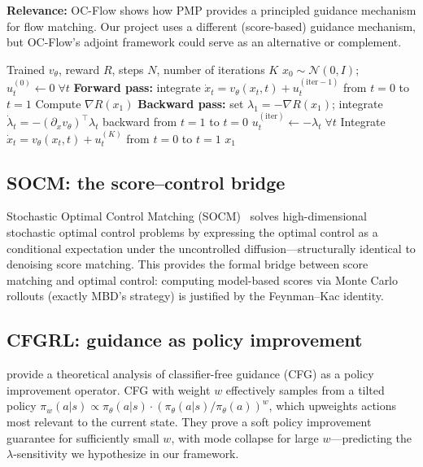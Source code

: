 \documentclass[11pt,letterpaper]{article}
\theoremstyle{plain}
\theoremstyle{definition}
\theoremstyle{remark}
\newcommand{\calN}{\mathcal{N}}
\newcommand{\grad}{\nabla}
\begin{document}
\textbf{Relevance:} OC-Flow shows how PMP provides a principled
guidance mechanism for flow matching.  Our project uses a different
(score-based) guidance mechanism, but OC-Flow's adjoint framework could
serve as an alternative or complement.

\begin{algorithm}[ht]
\caption{OC-Flow: PMP-Based Guidance for Flow Matching}\label{alg:ocflow}
\begin{algorithmic}[1]
\Require Trained $v_\theta$, reward $R$, steps $N$, number of iterations $K$
\State $x_0\sim\calN(0,I)$; $u_t^{(0)}\gets 0\;\forall t$ 
  \State \textbf{Forward pass:} integrate $\dot x_t=v_\theta(x_t,t)+u_t^{(\mathrm{iter}-1)}$
    from $t=0$ to $t=1$
  \State Compute $\grad R(x_1)$ 
  \State \textbf{Backward pass:} set $\lambda_1=-\grad R(x_1)$; integrate
    $\dot\lambda_t=-(\partial_x v_\theta)^\top\lambda_t$ backward from $t=1$ to $t=0$
  \State $u_t^{(\mathrm{iter})}\gets-\lambda_t\;\forall t$ 
\EndFor
\State Integrate $\dot x_t=v_\theta(x_t,t)+u_t^{(K)}$ from $t=0$ to $t=1$
\State \Return $x_1$ 
\end{algorithmic}
\end{algorithm}

\subsection{SOCM: the score--control bridge}

Stochastic Optimal Control Matching (SOCM)~\citep{domingoenrich2024socm}
solves high-dimensional stochastic optimal control problems by
expressing the optimal control as a conditional expectation under the
uncontrolled diffusion---structurally identical to denoising score
matching.  This provides the formal bridge between score matching and
optimal control: computing model-based scores via Monte Carlo rollouts
(exactly MBD's strategy) is justified by the Feynman--Kac identity.

\subsection{CFGRL: guidance as policy improvement}

\citet{cfgrl} provide a theoretical analysis of classifier-free
guidance (CFG) as a policy improvement operator.  CFG with weight $w$
effectively samples from a tilted policy
$\pi_w(a|s)\propto\pi_\theta(a|s)\cdot(\pi_\theta(a|s)/\pi_\theta(a))^w$,
which upweights actions most relevant to the current state.  They prove
a soft policy improvement guarantee for sufficiently small $w$, with
mode collapse for large $w$---predicting the
$\lambda$-sensitivity we hypothesize in our framework.
\end{document}
